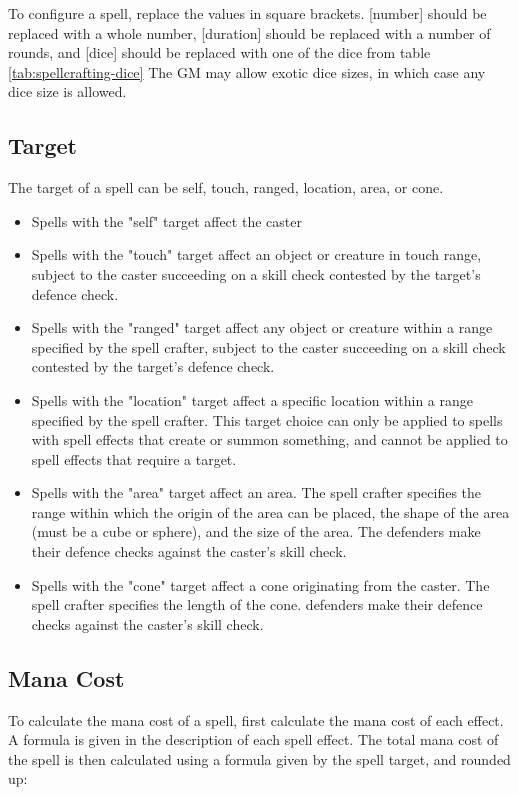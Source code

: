 \begin{multicols*}{2}
    To configure a spell, replace the values in square brackets. [number] should
    be replaced with a whole number, [duration] should be replaced with a number
    of rounds, and [dice] should be replaced with one of the dice from table
    \ref{tab:spellcrafting-dice}
    The GM may allow exotic dice sizes, in which case any dice size is allowed.

    \subsection{Target}
    The target of a spell can be self, touch, ranged, location, area, or cone.
    \begin{itemize}
        \item Spells with the "self" target affect the caster
        \item Spells with the "touch" target affect an object or creature in
            touch range, subject to the caster succeeding on a skill check
            contested by the target's defence check.
        \item Spells with the "ranged" target affect any object or creature
            within a range specified by the spell crafter, subject to the caster
            succeeding on a skill check contested by the target's defence check.
        \item Spells with the "location" target affect a specific location
            within a range specified by the spell crafter.
            This target choice can only be applied to spells with spell effects
            that create or summon something, and cannot be applied to spell
            effects that require a target.
        \item Spells with the "area" target affect an area. The spell crafter
            specifies the range within which the origin of the area can be
            placed, the shape of the area (must be a cube or sphere), and the
            size of the area. The defenders make their defence checks against
            the caster's skill check.
        \item Spells with the "cone" target affect a cone originating from
            the caster. The spell crafter specifies the length of the cone.
            defenders make their defence checks against the caster's skill
            check.
    \end{itemize}

    \subsection{Mana Cost}
    To calculate the mana cost of a spell, first calculate the mana cost of
    each effect. A formula is given in the description of each spell effect.
    The total mana cost of the spell is then calculated using a formula given
    by the spell target, and rounded up:
    

\end{multicols*}
